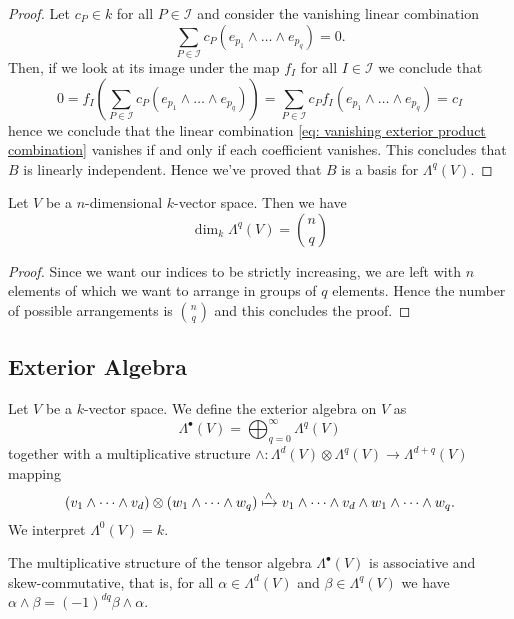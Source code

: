 \begin{proof}
  Let \(c_P \in k\) for all \(P \in \mathcal I\) and consider the vanishing
  linear combination
  \begin{equation}\label{eq: vanishing exterior product combination}
    \sum_{P \in \mathcal I} c_P (e_{p_1} \wedge \dots \wedge e_{p_q}) = 0.
  \end{equation}
  Then, if we look at its image under the map \(f_I\) for all \(I \in \mathcal
  I\) we conclude that
  \[
    0 = f_I\left( \sum_{P \in \mathcal I} c_P (e_{p_1} \wedge \dots \wedge
    e_{p_q}) \right) = \sum_{P \in \mathcal I} c_P f_I(e_{p_1} \wedge \dots \wedge
    e_{p_q}) = c_I 
  \] 
  hence we conclude that the linear combination \cref{eq: vanishing exterior
  product combination} vanishes if and only if each coefficient vanishes. This
  concludes that \(B\) is linearly independent. Hence we've proved that \(B\) is
  a basis for \(\Lambda^q(V)\).
\end{proof}

\begin{proposition}
  Let \(V\) be a \(n\)-dimensional \(k\)-vector space. Then we have
  \[
    \dim_k \Lambda^q(V) = \binom n q
  \] 
\end{proposition}

\begin{proof}
  Since we want our indices to be strictly increasing, we are left with \(n\)
  elements of which we want to arrange in groups of \(q\) elements. Hence the
  number of possible arrangements is \(\binom n q\) and this concludes the
  proof.
\end{proof}

\subsection{Exterior Algebra}

\begin{definition}
  \label{def: exterior algebra}
  Let \(V\) be a \(k\)-vector space. We define the exterior algebra on \(V\) as
  \[
    \Lambda^\bullet(V) = \bigoplus_{q=0}^\infty \Lambda^q(V)
  \] 
  together with a multiplicative structure \(\wedge: \Lambda^d(V) \otimes
  \Lambda^q(V) \to \Lambda^{d+q}(V)\) mapping
  \[
    (v_1 \wedge \dots \wedge v_d) \otimes (w_1 \wedge \dots \wedge w_q) \xmapsto
    \wedge v_1 \wedge \dots \wedge v_d \wedge w_1 \wedge \dots \wedge w_q.
  \] 
  We interpret \(\Lambda^0(V) = k\).
\end{definition}

\begin{proposition}
  The multiplicative structure of the tensor algebra \(\Lambda^\bullet(V)\) is
  associative and skew-commutative, that is, for all \(\alpha \in \Lambda^d(V)\) 
  and \(\beta \in \Lambda^q(V)\) we have \(\alpha \wedge \beta = (-1)^{d q} \beta
  \wedge \alpha\).
\end{proposition}

